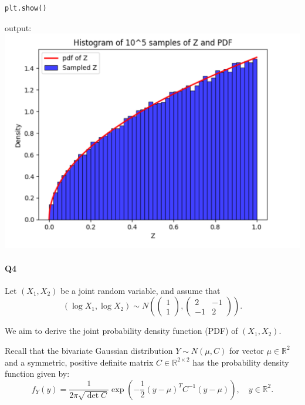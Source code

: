 \documentclass[10pt,letterpaper]{article}
\begin{document}
\begin{enumerate}[(a)]
\begin{lstlisting}[language=Python]
plt.show()
\end{lstlisting}
output:
\includegraphics[scale=.7]{q3graph.png}\\
\end{enumerate}

\paragraph{Q4}
Let \((X_1, X_2)\) be a joint random variable, and assume that 
\[
(\log X_1, \log X_2) \sim N\left(\begin{pmatrix} 1 \\ 1 \end{pmatrix}, \begin{pmatrix} 2 & -1 \\ -1 & 2 \end{pmatrix}\right).
\]

We aim to derive the joint probability density function (PDF) of \((X_1, X_2)\).

Recall that the bivariate Gaussian distribution \(Y \sim N(\mu, C)\) for vector \(\mu \in \mathbb{R}^2\) and a symmetric, positive definite matrix \(C \in \mathbb{R}^{2 \times 2}\) has the probability density function given by:
\[
f_Y(y) = \frac{1}{2\pi \sqrt{\det C}} \exp\left(-\frac{1}{2} (y - \mu)^T C^{-1} (y - \mu)\right), \quad y \in \mathbb{R}^2.
\]
\end{document}
